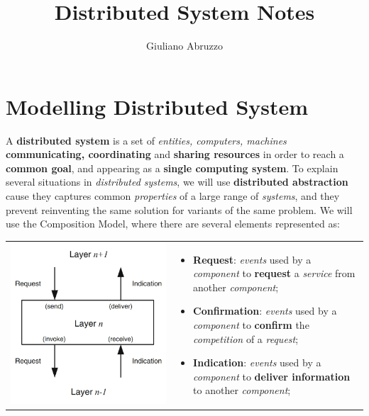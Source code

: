 \documentclass{article}
\author{Giuliano Abruzzo}
\title{Distributed System Notes}
\begin{document}
\maketitle
\newpage
\tableofcontents
\newpage
\section{Modelling Distributed System}
A \textbf{distributed system} is a set of \emph{entities, computers, machines} \textbf{communicating, coordinating} and \textbf{sharing resources} in order to reach a \textbf{common goal}, and appearing as a \textbf{single computing system}. To explain several situations in \emph{distributed systems}, we will use \textbf{distributed abstraction} cause they captures common \emph{properties} of a large range of \emph{systems}, and they prevent reinventing the same solution for variants of the same problem. We will use the Composition Model, where there are several elements represented as:\\
\begin{tabular}{C{4cm}  L{10.5cm}}
        \includegraphics[scale=0.6]{cattura.png} & \begin{itemize}
  \item \textbf{Request}: \emph{events} used by a \emph{component} to \textbf{request} a \emph{service} from another \emph{component};
  \item \textbf{Confirmation}: \emph{events} used by a \emph{component} to \textbf{confirm} the \emph{competition} of a \emph{request};
  \item \textbf{Indication}: \emph{events} used by a \emph{component} to \textbf{deliver information} to another \emph{component};
  \end{itemize}
\end{tabular}\\\\
\end{document}
